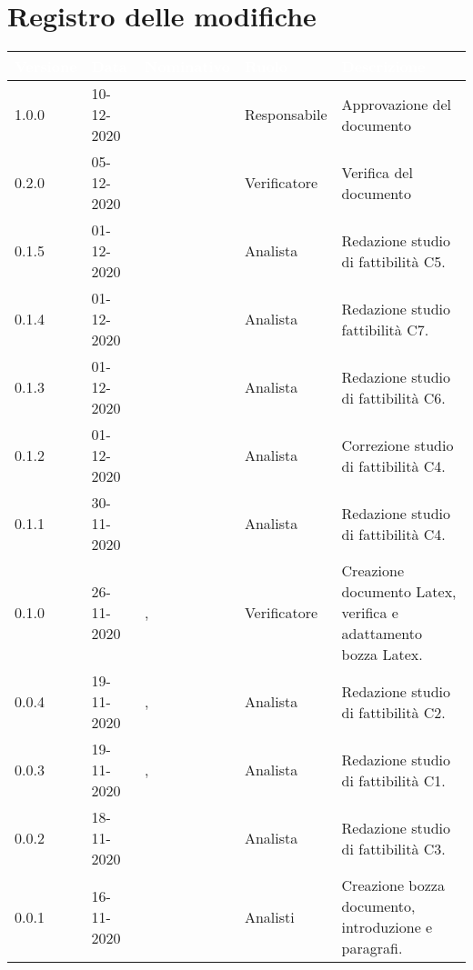 \section*{Registro delle modifiche}
{
\renewcommand{\arraystretch}{1.5}
\centering
\begin{longtable}{C{1.7cm} C{2.5cm} C{3.2cm} C{2.7cm} C{4.8cm}}
\textcolor{white}{\textbf{Versione}}&
\textcolor{white}{\textbf{Data}}&
\textcolor{white}{\textbf{Nominativo}}&
\textcolor{white}{\textbf{Ruolo}}&
\textcolor{white}{\textbf{Descrizione}}\\	
\endhead

1.0.0 & 10-12-2020 & \BM{} & Responsabile & Approvazione del documento\\  
0.2.0 & 05-12-2020 & \SG{} & Verificatore & Verifica del documento\\
0.1.5 & 01-12-2020 & \SH{} & Analista & Redazione studio di fattibilità C5.\\
0.1.4 & 01-12-2020 & \PA{} & Analista & Redazione studio fattibilità C7.\\
0.1.3 & 01-12-2020 & \RA{} & Analista & Redazione studio di fattibilità C6.\\
0.1.2 & 01-12-2020 & \ZM{} & Analista & Correzione studio di fattibilità C4.\\
0.1.1 & 30-11-2020 & \ZM{} & Analista & Redazione studio di fattibilità C4.\\
0.1.0 & 26-11-2020 & \SG{}, \BM{} & Verificatore & Creazione documento Latex, verifica e adattamento bozza Latex. \\
0.0.4 & 19-11-2020 & \ZM{}, \SP{} & Analista & Redazione studio di fattibilità C2.\\
0.0.3 & 19-11-2020 & \ZM{}, \SP{} & Analista & Redazione studio di fattibilità C1.\\		
0.0.2 & 18-11-2020 & \PA{} & Analista & Redazione studio di fattibilità C3.\\
0.0.1 & 16-11-2020 & \Gruppo{} & Analisti & Creazione bozza documento, introduzione e paragrafi. \\	
\end{longtable}
}
